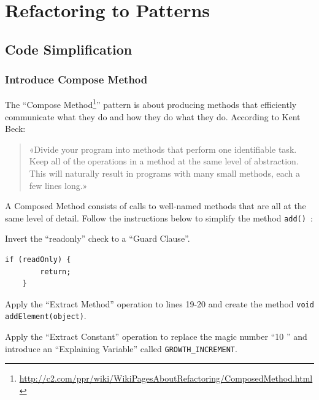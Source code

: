 \documentclass[a4paper,11pt]{memoir}
\newcommand{\code}[1]{\lstinline{#1}}
\begin{document}
\chapter{Refactoring to Patterns}

\section{Code Simplification}
\subsection{Introduce Compose Method}
The ``Compose Method\footnote{\url{http://c2.com/ppr/wiki/WikiPagesAboutRefactoring/ComposedMethod.html}}'' pattern is about producing methods that efficiently communicate what they do and how they do what they do. 
According to Kent Beck:

\begin{quotation}
	«Divide your program into methods that perform one identifiable task. Keep all of the operations in a method at the same level of abstraction. 
	This will naturally result in programs with many small methods, each a few lines long.»
\end{quotation}

A Composed Method consists of calls to well-named methods that are all at the same level of detail.
Follow the instructions below to simplify the method \code{add()}~\cite{Kerievsky:2004}:



\begin{exercise}
	Invert the ``readonly'' check to a ``Guard Clause''.
\end{exercise}

\begin{solution}
\begin{lstlisting}[caption=cap,label=lst:lab]
    if (readOnly) {
        return;
    }
\end{lstlisting}

\end{solution}

\begin{exercise}
	Apply the ``Extract Method'' operation to lines 19-20 and create the method \code{void addElement(object)}.
\end{exercise}

\begin{exercise}
	Apply the ``Extract Constant'' operation to replace the magic number ``10 '' and introduce an ``Explaining Variable'' called \code{GROWTH_INCREMENT}.
\end{exercise}
\end{document}
